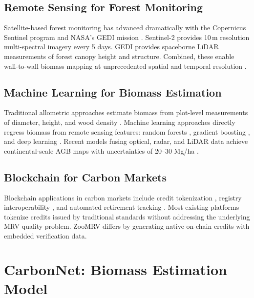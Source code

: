 \documentclass[11pt,a4paper]{article}
\begin{document}
\subsection{Remote Sensing for Forest Monitoring}

Satellite-based forest monitoring has advanced dramatically with the
Copernicus Sentinel program \citep{drusch2012sentinel} and NASA's
GEDI mission \citep{dubayah2020global}. Sentinel-2 provides 10\,m
resolution multi-spectral imagery every 5 days. GEDI provides
spaceborne LiDAR measurements of forest canopy height and structure.
Combined, these enable wall-to-wall biomass mapping at unprecedented
spatial and temporal resolution \citep{lang2023high}.

\subsection{Machine Learning for Biomass Estimation}

Traditional allometric approaches estimate biomass from plot-level
measurements of diameter, height, and wood density \citep{chave2014improved}.
Machine learning approaches directly regress biomass from remote sensing
features: random forests \citep{rodriguez2021predicting}, gradient
boosting \citep{hancock2019gradient}, and deep learning
\citep{lang2023high}. Recent models fusing optical, radar, and LiDAR
data achieve continental-scale AGB maps with uncertainties of 20--30
Mg/ha \citep{xu2021changes}.

\subsection{Blockchain for Carbon Markets}

Blockchain applications in carbon markets include credit tokenization
\citep{schletz2020blockchain}, registry interoperability
\citep{franke2020blockchain}, and automated retirement tracking
\citep{howson2019crypto}. Most existing platforms tokenize credits
issued by traditional standards without addressing the underlying MRV
quality problem. ZooMRV differs by generating native on-chain credits
with embedded verification data.


\section{CarbonNet: Biomass Estimation Model}
\label{sec:carbonnet}
\end{document}
